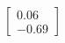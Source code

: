 \documentclass[preview]{standalone}
\begin{document}
\begin{align*}
\begin{bmatrix} 0.06 \\ -0.69 \end{bmatrix}
\end{align*}
\end{document}
